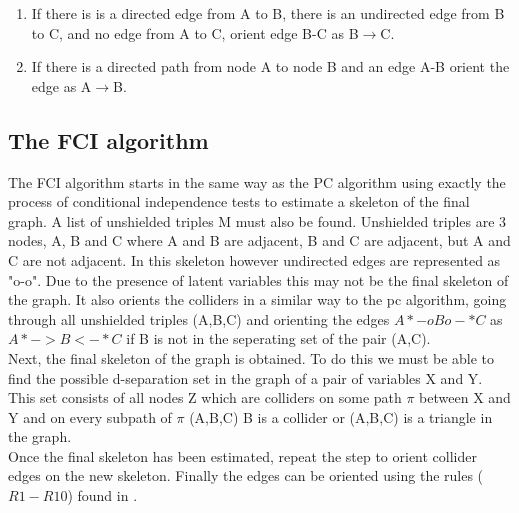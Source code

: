 \documentclass{article}
\begin{document}
\begin{enumerate}[i]
  \item If there is is a directed edge from A to B, there is an undirected edge from B to C, and no edge from A to C, orient edge B-C as B$\rightarrow$C.
  \item If there is a directed path from node A to node B and an edge A-B orient the edge as A$\rightarrow$B\cite{spirtes1991algorithm}. 
\end{enumerate}


\subsection{The FCI algorithm}

The FCI algorithm starts in the same way as the PC algorithm using exactly the process of conditional independence tests to estimate a skeleton of the final graph. A list of unshielded triples M must also be found. Unshielded triples are 3 nodes, A, B and C where A and B are adjacent, B and C are adjacent, but A and C are not adjacent. In this skeleton however undirected edges are represented as "o-o". Due to the presence of latent variables this may not be the final skeleton of the graph. It also orients the colliders in a similar way to the pc algorithm, going through all unshielded triples (A,B,C) and orienting the edges $A*-oBo-*C$ as $A*->B<-*C$ if B is not in the seperating set of the pair (A,C).
\\

Next, the final skeleton of the graph is obtained. To do this we must be able to find the possible d-separation set in the graph of a pair of variables X and Y. This set consists of all nodes Z which are colliders on some path $\pi$ between X and Y and on every subpath of $\pi$ (A,B,C) B is a collider or (A,B,C) is a triangle in the graph.
\\

Once the final skeleton has been estimated, repeat the step to orient collider edges on the new skeleton. Finally the edges can be oriented using the rules ($R1-R10$) found in \cite{ZHANG20081873}.\cite{colombo2012learning}
\\
\end{document}
